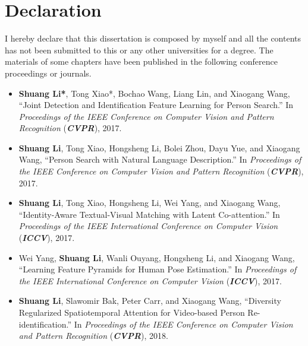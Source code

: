 \chapter*{Declaration}

I hereby declare that this dissertation is composed by myself and all the contents has not been submitted to this or any other universities for a degree. The materials of some chapters have been published in the following conference proceedings or journals.

\begin{itemize}
  \item \textbf{Shuang Li*}, Tong Xiao*, Bochao Wang, Liang Lin, and Xiaogang Wang, ``Joint Detection and Identification Feature Learning for Person Search.'' In \textit{Proceedings of the IEEE Conference on Computer Vision and Pattern Recognition} (\textit{\textbf{CVPR}}), 2017.

  \item \textbf{Shuang Li}, Tong Xiao, Hongsheng Li, Bolei Zhou, Dayu Yue, and Xiaogang Wang, ``Person Search with Natural Language Description.'' In \textit{Proceedings of the IEEE Conference on Computer Vision and Pattern Recognition} (\textit{\textbf{CVPR}}), 2017.

  \item \textbf{Shuang Li}, Tong Xiao, Hongsheng Li, Wei Yang, and Xiaogang Wang, ``Identity-Aware Textual-Visual Matching with Latent Co-attention.'' In \textit{Proceedings of the IEEE International Conference on Computer Vision} (\textit{\textbf{ICCV}}), 2017.

  \item Wei Yang, \textbf{Shuang Li}, Wanli Ouyang, Hongsheng Li, and Xiaogang Wang, ``Learning Feature Pyramids for Human Pose Estimation.'' In \textit{Proceedings of the IEEE International Conference on Computer Vision} (\textit{\textbf{ICCV}}), 2017.

  \item \textbf{Shuang Li}, Slawomir Bak, Peter Carr, and Xiaogang Wang, ``Diversity Regularized Spatiotemporal Attention for Video-based Person Re-identification.'' In \textit{Proceedings of the IEEE Conference on Computer Vision and Pattern Recognition} (\textit{\textbf{CVPR}}), 2018.

\end{itemize}
